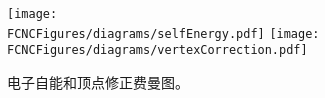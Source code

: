 
\begin{figure}[H]
\centering
\texttt{[image: \\FCNCFigures/diagrams/selfEnergy.pdf]}
\texttt{[image: \\FCNCFigures/diagrams/vertexCorrection.pdf]}\\
\caption{ 电子自能和顶点修正费曼图。 }
\label{fig:QEDloop}
\end{figure}